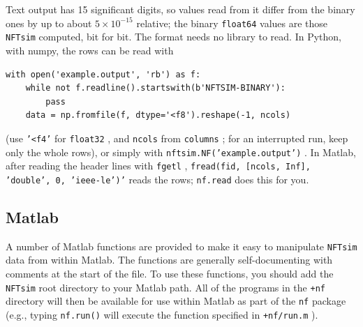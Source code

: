 \documentclass[12pt,a4paper]{article}
\newcommand{\type}[1]{{\small\small\tt #1} }
\newcommand{\NF}[0]{\type{NFTsim}}
\begin{document}
Text output has 15 significant digits, so values read from it differ from the binary ones by up to about $5\times 10^{-15}$ relative; the binary \type{float64} values are those \NF computed, bit for bit.
The format needs no library to read.
In Python, with numpy, the rows can be read with
\begin{lstlisting}
with open('example.output', 'rb') as f:
    while not f.readline().startswith(b'NFTSIM-BINARY'):
        pass
    data = np.fromfile(f, dtype='<f8').reshape(-1, ncols)
\end{lstlisting}
(use \type{'<f4'} for \type{float32}, and \type{ncols} from \type{columns}; for an interrupted run, keep only the whole rows), or simply with \type{nftsim.NF('example.output')}.
In Matlab, after reading the header lines with \type{fgetl}, \type{fread(fid, [ncols, Inf], 'double', 0, 'ieee-le')'} reads the rows; \type{nf.read} does this for you.

\subsection{Matlab}
A number of Matlab functions are provided to make it easy to manipulate \NF data from within Matlab. The functions are generally self-documenting with comments at the start of the file. To use these functions, you should add the \NF root directory to your Matlab path. All of the programs in the \type{+nf} directory will then be available for use within Matlab as part of the \type{nf} package (e.g., typing \type{nf.run()} will execute the function specified in \type{+nf/run.m}).
\end{document}
